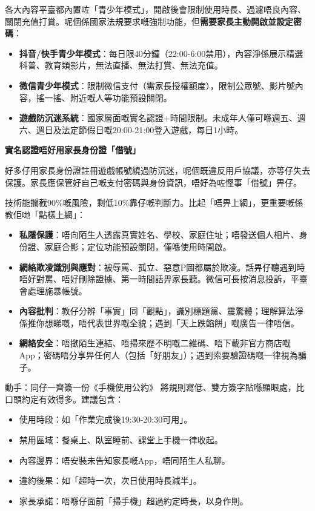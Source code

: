 
各大內容平臺都內置咗「青少年模式」，開啟後會限制使用時長、過濾唔良內容、關閉充值打賞。呢個係國家法規要求嘅強制功能，但\textbf{需要家長主動開啟並設定密碼}：

\begin{itemize}
  \item \textbf{抖音/快手青少年模式}：每日限40分鐘（22:00-6:00禁用），內容淨係展示精選科普、教育類影片，無法直播、無法打賞、無法充值。
  \item \textbf{微信青少年模式}：限制微信支付（需家長授權額度），限制公眾號、影片號內容，搖一搖、附近嘅人等功能預設關閉。
  \item \textbf{遊戲防沉迷系統}：國家層面嘅實名認證+時間限制。未成年人僅可喺週五、週六、週日及法定節假日嘅20:00-21:00登入遊戲，每日1小時。
\end{itemize}

\textbf{實名認證唔好用家長身份證「借號」}\par

好多仔用家長身份證註冊遊戲帳號繞過防沉迷，呢個既違反用戶協議，亦等仔失去保護。家長應保管好自己嘅支付密碼與身份資訊，唔好為咗慳事「借號」畀仔。


技術能攔截90\%嘅風險，剩低10\%靠仔嘅判斷力。比起「唔畀上網」，更重要嘅係教佢哋「點樣上網」：

\begin{itemize}
  \item \textbf{私隱保護}：唔向陌生人透露真實姓名、學校、家庭住址；唔發送個人相片、身份證、家庭合影；定位功能預設關閉，僅喺使用時開啟。
  \item \textbf{網絡欺凌識別與應對}：被辱罵、孤立、惡意P圖都屬於欺凌。話畀仔聽遇到時唔好對罵、唔好刪除證據、第一時間話畀家長聽。微信可長按消息投訴，平臺會處理施暴帳號。
  \item \textbf{內容批判}：教仔分辨「事實」同「觀點」，識別標題黨、震驚體；理解算法淨係推你想睇嘅，唔代表世界嘅全貌；遇到「天上跌餡餅」嘅廣告一律唔信。
  \item \textbf{網絡安全}：唔撳陌生連結、唔掃來歷不明嘅二維碼、唔下載非官方商店嘅App；密碼唔分享畀任何人（包括「好朋友」）；遇到索要驗證碼嘅一律視為騙子。
\end{itemize}

\begin{tcbpractice}{動手：同仔一齊簽一份《手機使用公約》}
將規則寫低、雙方簽字貼喺顯眼處，比口頭約定有效得多。建議包含：

\begin{itemize}
  \item 使用時段：如「作業完成後19:30-20:30可用」。
  \item 禁用區域：餐桌上、臥室睡前、課堂上手機一律收起。
  \item 內容邊界：唔安裝未告知家長嘅App，唔同陌生人私聊。
  \item 違約後果：如「超時一次，次日使用時長減半」。
  \item 家長承諾：唔喺仔面前「掃手機」超過約定時長，以身作則。
\end{itemize}

\end{tcbpractice}

